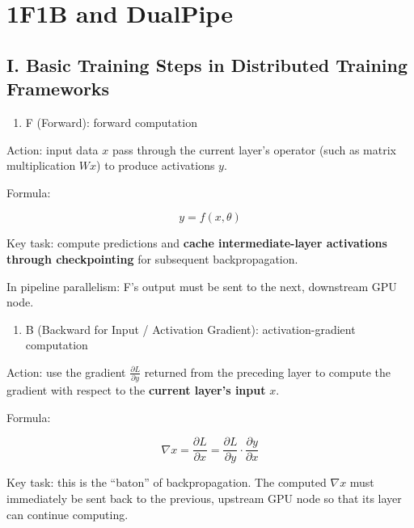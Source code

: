 \setcounter{section}{3}

\hypertarget{f1b-and-dualpipe}{%
\section{1F1B and DualPipe}\label{f1b-and-dualpipe}}

\hypertarget{i.-basic-training-steps-in-distributed-training-frameworks}{%
\subsection{I. Basic Training Steps in Distributed Training Frameworks}\label{i.-basic-training-steps-in-distributed-training-frameworks}}

\begin{enumerate}
\def\labelenumi{\arabic{enumi}.}
\tightlist
\item
  F (Forward): forward computation
\end{enumerate}

Action: input data \(x\) pass through the current layer's operator (such as matrix multiplication \(Wx\)) to produce activations \(y\).

Formula:

\[
y = f(x, \theta)
\]

Key task: compute predictions and \textbf{cache intermediate-layer activations through checkpointing} for subsequent backpropagation.

In pipeline parallelism: F's output must be sent to the next, downstream GPU node.

\begin{enumerate}
\def\labelenumi{\arabic{enumi}.}
\setcounter{enumi}{1}
\tightlist
\item
  B (Backward for Input / Activation Gradient): activation-gradient computation
\end{enumerate}

Action: use the gradient \(\frac{\partial L}{\partial y}\) returned from the preceding layer to compute the gradient with respect to the \textbf{current layer's input} \(x\).

Formula:

\[
\nabla x = \frac{\partial L}{\partial x} = \frac{\partial L}{\partial y} \cdot \frac{\partial y}{\partial x}
\]

Key task: this is the ``baton'' of backpropagation. The computed \(\nabla x\) must immediately be sent back to the previous, upstream GPU node so that its layer can continue computing.

